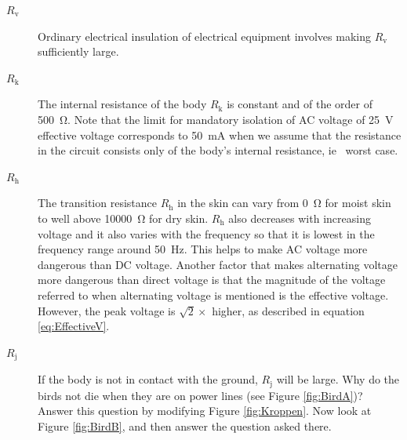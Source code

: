 \documentclass[../Elmag-labhefte-2022.tex]{subfiles}
\begin{document}
\begin{description}
    \item [$R_\text{v}$] Ordinary electrical insulation of electrical equipment involves making $R_\text{v}$ sufficiently large.
    
    
    \item [$R_\text{k}$] The internal resistance of the body $R_\text{k}$ is constant and of the order of \SI{500}{\ohm}. Note that the limit for mandatory isolation of AC voltage of \SI{25}{\V} effective voltage corresponds to \SI{50}{\milli\ampere} when we assume that the resistance in the circuit consists only of the body's internal resistance, ie \ worst case.
    \item [$R_\text{h}$] The transition resistance $R_\text{h}$ in the skin can vary from \SI{0}{\ohm} for moist skin to well above \SI{10000}{\ohm} for dry skin. $R_\text{h}$ also decreases with increasing voltage and it also varies with the frequency so that it is lowest in the frequency range around \SI{50}{\hertz}. This helps to make AC voltage more dangerous than DC voltage. Another factor that makes alternating voltage more dangerous than direct voltage is that the magnitude of the voltage referred to when alternating voltage is mentioned is the effective voltage. However, the peak voltage is $\sqrt{2} \times $ higher, as described in equation \eqref{eq:EffectiveV}.
    \item [$R_\text{j}$] If the body is not in contact with the ground, $R_\text{j}$ will be large. Why do the birds not die when they are on power lines (see Figure \ref{fig:BirdA})? Answer this question by modifying Figure \ref{fig:Kroppen}. Now look at Figure \ref{fig:BirdB}, and then answer the question asked there.
\end{description}
\end{document}
